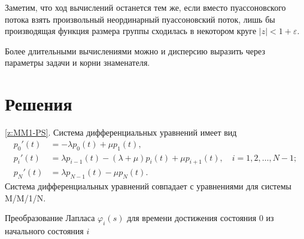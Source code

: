 \documentclass[10pt,oneside,final]{book}
\begin{document}
Заметим, что ход вычислений останется тем же, если вместо пуассоновского потока взять произвольный
неординарный пуассоновский поток, лишь бы производящая функция размера группы сходилась в некотором
круге $|z|<1+\varepsilon$.

Более длительными вычислениями можно и дисперсию выразить через параметры задачи и корни знаменателя.


\chapter{Решения}
\ref{z:MM1-PS}. Система дифференциальных уравнений имеет вид
\begin{align*}
  p_0'(t) & = -\lambda p_0(t)+\mu p_1(t),\\
  p_i'(t) & = \lambda p_{i-1}(t)-(\lambda+\mu)p_i(t)+\mu p_{i+1}(t), \quad i=1,
  2, \ldots, N-1;\\
  p_N'(t) & = \lambda p_{N-1}(t)-\mu p_N(t).
\end{align*}
Система дифференциальных уравнений совпадает с уравнениями для системы M/M/1/N.

Преобразование Лапласа $\varphi_i(s)$ для времени достижения состояния $0$ из
начального состояния $i$
\end{document}
